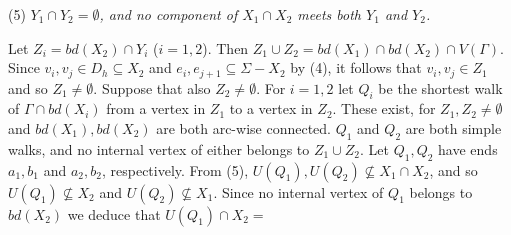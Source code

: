 \hspace*{12pt}(5) \textit{$Y_1 \cap Y_2 = \emptyset$, and no component of $X_1 \cap X_2$ meets both $Y_1$ and $Y_2$.}

Let $Z_i = bd(X_2) \cap Y_i$ ($i = 1, 2$). Then $Z_1 \cup Z_2 = bd(X_1) \cap bd(X_2) \cap V(\Gamma)$. Since $v_i, v_j \in D_h \subseteq X_2$ and $e_i, e_{j+1} \subseteq \Sigma - X_2$ by (4), it follows that $v_i, v_j \in Z_1$ and so $Z_1 \ne \emptyset$. Suppose that also $Z_2 \ne \emptyset$. For $i = 1, 2$ let $Q_i$ be the shortest walk of $\Gamma \cap bd(X_i)$ from a vertex in $Z_1$ to a vertex in $Z_2$. These exist, for $Z_1, Z_2 \ne \emptyset$ and $bd(X_1), bd(X_2)$ are both arc-wise connected. $Q_1$ and $Q_2$ are both simple walks, and no internal vertex of either belongs to $Z_1 \cup Z_2$. Let $Q_1, Q_2$ have ends $a_1, b_1$ and $a_2, b_2$, respectively. From (5), $U(Q_1), U(Q_2) \nsubseteq X_1 \cap X_2$, and so $U(Q_1) \nsubseteq X_2$ and $U(Q_2) \nsubseteq X_1$. Since no internal vertex of $Q_1$ belongs to $bd(X_2)$ we deduce that $U(Q_1) \cap X_2 =$
